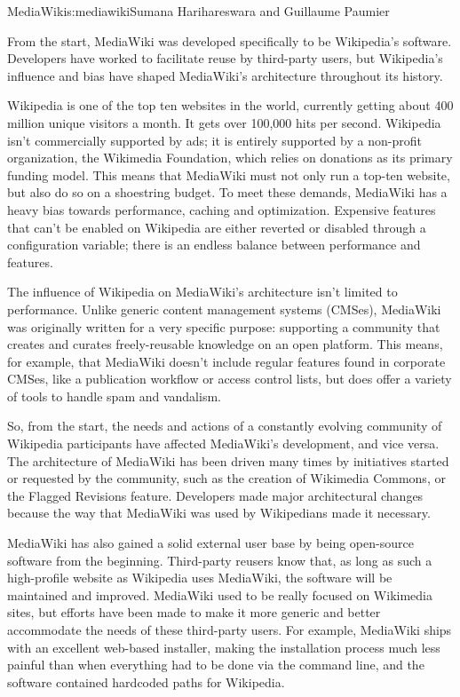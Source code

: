 \begin{aosachapter}{MediaWiki}{s:mediawiki}{Sumana Harihareswara and Guillaume Paumier}

From the start, MediaWiki was developed specifically to be Wikipedia's
software. Developers have worked to facilitate reuse by third-party
users, but Wikipedia's influence and bias have shaped MediaWiki's
architecture throughout its history.

Wikipedia is one of the top ten websites in the world, currently
getting about 400 million unique visitors a month. It gets over
100,000 hits per second. Wikipedia isn't commercially supported by
ads; it is entirely supported by a non-profit organization, the
Wikimedia Foundation, which relies on donations as its primary funding
model. This means that MediaWiki must not only run a top-ten website,
but also do so on a shoestring budget. To meet these demands,
MediaWiki has a heavy bias towards performance, caching and
optimization. Expensive features that can't be enabled on Wikipedia
are either reverted or disabled through a configuration variable;
there is an endless balance between performance and features.

The influence of Wikipedia on MediaWiki's architecture isn't limited
to performance. Unlike generic content management systems (CMSes),
MediaWiki was originally written for a very specific purpose:
supporting a community that creates and curates freely-reusable
knowledge on an open platform. This means, for example, that MediaWiki
doesn't include regular features found in corporate CMSes, like a
publication workflow or access control lists, but does offer a variety
of tools to handle spam and vandalism.

So, from the start, the needs and actions of a constantly evolving
community of Wikipedia participants have affected MediaWiki's
development, and vice versa. The architecture of MediaWiki has been
driven many times by initiatives started or requested by the
community, such as the creation of Wikimedia Commons, or the Flagged
Revisions feature. Developers made major architectural changes because
the way that MediaWiki was used by Wikipedians made it necessary.

MediaWiki has also gained a solid external user base by being
open-source software from the beginning. Third-party reusers know
that, as long as such a high-profile website as Wikipedia uses
MediaWiki, the software will be maintained and improved. MediaWiki
used to be really focused on Wikimedia sites, but efforts have been
made to make it more generic and better accommodate the needs of these
third-party users. For example, MediaWiki ships with an excellent
web-based installer, making the installation process much less painful
than when everything had to be done via the command line, and the
software contained hardcoded paths for Wikipedia.


\end{aosachapter}
